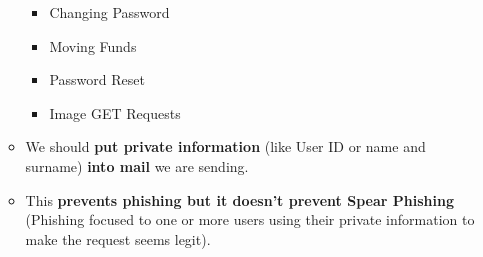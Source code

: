 \documentclass[9pt, letterpaper]{article}
\begin{document}
\begin{itemize}
\begin{itemize}
		            \begin{itemize}
			            \item Changing Password
			            \item Moving Funds
			            \item Password Reset
			            \item Image GET Requests
		            \end{itemize}
		      \item We should \textbf{put private information} (like User ID or name and surname) \textbf{into mail} we are sending.
		      \item This \textbf{prevents phishing but it doesn't prevent Spear Phishing} (Phishing focused to one or more users using their private information to make the request seems legit).
	      \end{itemize}
\end{itemize}
\end{document}

